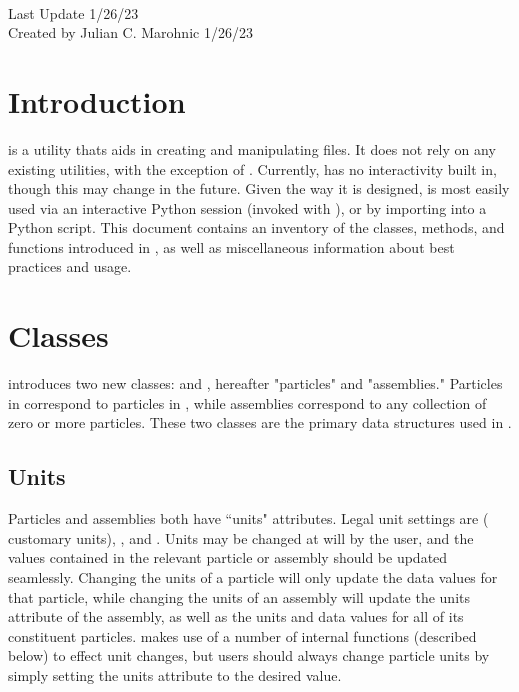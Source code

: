 



\begin{flushleft}

\huge{}\\
\bigskip\bigskip
\Large{Last Update 1/26/23}\\
\bigskip\bigskip
\large{Created by Julian C. Marohnic 1/26/23}\\

\end{flushleft}

\setcounter{tocdepth}{2}
\tableofcontents

\section{Introduction}

 is a utility thats aids in creating and manipulating \pkd{}  files. It does not rely on any existing \pkd{} utilities, with the exception of . Currently,  has no interactivity built in, though this may change in the future. Given the way it is designed,  is most easily used via an interactive Python session (invoked with ), or by importing  into a Python script. This document contains an inventory of the classes, methods, and functions introduced in , as well as miscellaneous information about best practices and usage. \\

\section{Classes}

 introduces two new classes:  and , hereafter "particles" and "assemblies." Particles in  correspond to particles in \pkd{}, while assemblies correspond to any collection of zero or more particles. These two classes are the primary data structures used in .

\subsection{Units}

Particles and assemblies both have ``units" attributes. Legal unit settings are  (\pkd{} customary units), , and . Units may be changed at will by the user, and the values contained in the relevant particle or assembly should be updated seamlessly. Changing the units of a particle will only update the data values for that particle, while changing the units of an assembly will update the units attribute of the assembly, as well as the units and data values for all of its constituent particles.  makes use of a number of internal functions (described below) to effect unit changes, but users should always change particle units by simply setting the units attribute to the desired value.




